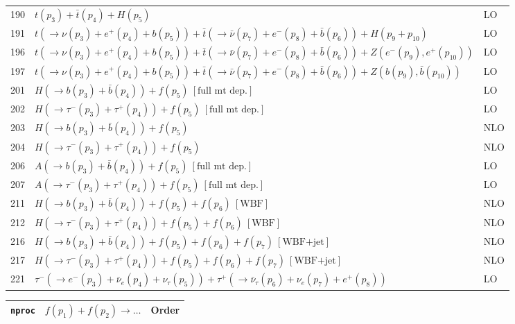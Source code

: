 \documentclass[12pt]{article}
\begin{document}
\begin{itemize}
\begin{table}
\begin{center}
\begin{tabular}{|l|l|l|}
\hline 
190& $t(p_3)+\bar{t}(p_4)+H(p_5) $ & LO \\
191& $ t(\to \nu(p_3)+e^+(p_4)+b(p_5))+\bar{t}(\to \bar{\nu}(p_7)+e^-(p_8)+\bar{b}(p_6))+H(p_9+p_{10}) $ & LO \\
\hline 
196& $ t(\to \nu(p_3)+e^+(p_4)+b(p_5))+\bar{t}(\to \bar{\nu}(p_7)+e^-(p_8)+\bar{b}(p_6))+Z(e^-(p_9),e^+(p_{10})) $ & LO \\
197& $ t(\to \nu(p_3)+e^+(p_4)+b(p_5))+\bar{t}(\to \bar{\nu}(p_7)+e^-(p_8)+\bar{b}(p_6))+Z(b(p_9),\bar{b}(p_{10})) $ & LO \\
\hline 
201& $ H(\to b(p_3)+\bar{b}(p_4)) + f(p_5) ~[ \mbox{full mt dep.} ] $ & LO \\
202& $ H(\to \tau^-(p_3)+\tau^+(p_4)) + f(p_5) ~[ \mbox{full mt dep.} ] $ & LO \\
203& $ H(\to b(p_3)+\bar{b}(p_4)) + f(p_5) $ & NLO \\
204& $ H(\to \tau^-(p_3)+\tau^+(p_4)) + f(p_5) $ & NLO \\
206& $ A(\to b(p_3)+\bar{b}(p_4)) + f(p_5) ~[ \mbox{full mt dep.} ] $ & LO \\
207& $ A(\to \tau^-(p_3)+\tau^+(p_4)) + f(p_5) ~[ \mbox{full mt dep.} ] $ & LO \\
\hline 
211& $ H(\to b(p_3)+\bar{b}(p_4))+f(p_5)+f(p_6) ~[ \mbox{WBF} ] $ & NLO \\
212& $ H(\to \tau^-(p_3)+\tau^+(p_4))+f(p_5)+f(p_6) ~[ \mbox{WBF} ] $ & NLO \\
216& $ H(\to b(p_3)+\bar{b}(p_4))+f(p_5)+f(p_6)+f(p_7) ~[ \mbox{WBF+jet} ] $ & NLO \\
217& $ H(\to \tau^-(p_3)+\tau^+(p_4))+f(p_5)+f(p_6)+f(p_7) ~[ \mbox{WBF+jet} ] $ & NLO \\
\hline 
221& $ \tau^-(\to e^-(p_3)+\bar{\nu}_e(p_4)+\nu_\tau(p_5))+\tau^+(\to \bar{\nu}_\tau(p_6)+\nu_e(p_7)+e^+(p_8)) $ & LO \\
\hline 
\end{tabular}
\end{center}
\end{table}
\begin{table}
\begin{center}
\hspace*{-1.5cm}
\begin{tabular}{|l|l|l|}
\hline
{\tt nproc} & $ f(p_1)+f(p_2) \to \ldots $& Order \\ 
\hline


\end{tabular}
\end{center}
\end{table}
\end{itemize}
\end{document}
